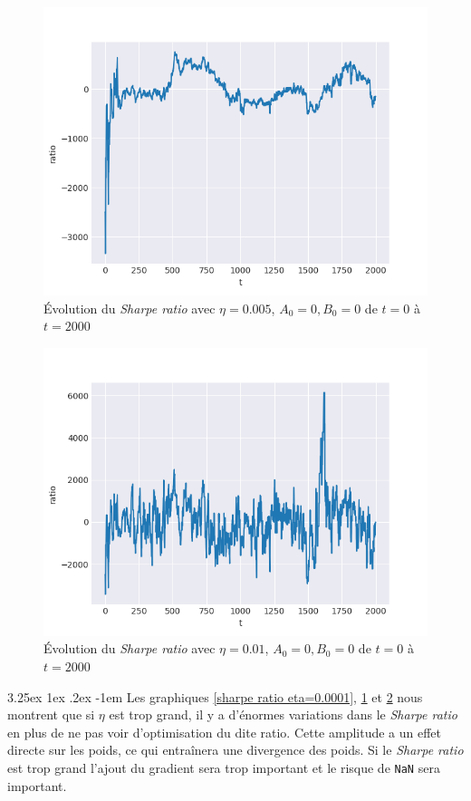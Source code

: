 \documentclass[a4paper, 11pt]{article}
\makeatletter
\renewcommand\paragraph{\@startsection{paragraph}{5}{\z@}%
  {3.25ex \@plus1ex \@minus.2ex}%
  {-1em}%
  {\normalfont\normalsize\bfseries}}
\makeatother
\begin{document}
 \begin{figure}[H]
 	\centering
 	\includegraphics[]{res/exemple_eta_0005}
 	\caption[Blup]{Évolution du \textit{Sharpe ratio} avec $\eta = 0.005$, $A_0 = 0, B_0 = 0$ de $t=0$ à $t=2000$}
 	\label{sharpe ratio eta=0.0005}
 \end{figure}
 
 \begin{figure}[H]
 	\centering
 	\includegraphics[]{res/exemple_eta_too_big}
 	\caption[Blup]{Évolution du \textit{Sharpe ratio} avec $\eta = 0.01$, $A_0 = 0, B_0 = 0$ de $t=0$ à $t=2000$}
	\label{sharpe ratio eta=0.01}
 \end{figure}
 
 \paragraph{}
 Les graphiques \ref{sharpe ratio eta=0.0001}, \ref{sharpe ratio eta=0.0005} et \ref{sharpe ratio eta=0.01} nous montrent que si $\eta$ est trop grand, il y a d'énormes variations dans le \textit{Sharpe ratio} en plus de ne pas voir d'optimisation
 du dite ratio. Cette amplitude a un effet directe sur les poids, ce qui entraînera une divergence des poids. Si le \textit{Sharpe ratio} est trop grand
 l'ajout du gradient sera trop important et le risque de \texttt{NaN} sera important.
 
\end{document}
